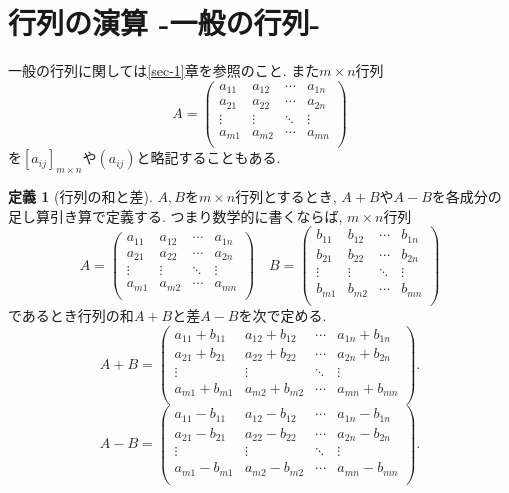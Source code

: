 \documentclass[dvipdfmx,a4paper,11pt]{article}
\theoremstyle{definition}
\newtheorem{dfn}[thm]{定義}
\begin{document}
 
\newpage

\section{行列の演算 -一般の行列-}

一般の行列に関しては\ref{sec-1}章を参照のこと.
また$m \times n$行列
$$
A=\begin{pmatrix}
a_{11}& a_{12} & \cdots &a_{1n} \\
a_{21}& a_{22} & \cdots &a_{2n} \\
\vdots& \vdots	&	\ddots   &	\vdots \\
a_{m1}& a_{m2} & \cdots &a_{mn} \\
\end{pmatrix}
$$
を$[a_{ij}]_{m\times n}$や$(a_{ij})$と略記することもある.


 \begin{tcolorbox}[
    colback = white,
    colframe = green!35!black,
    fonttitle = \bfseries,
    breakable = true]
    \begin{dfn}[行列の和と差]
    \text{}
 $A,B$を$m \times n$行列とするとき, $A+B$や$A-B$を各成分の足し算引き算で定義する. 
 つまり数学的に書くならば, $m \times n$行列
$$
A=\begin{pmatrix}
a_{11}& a_{12} & \cdots &a_{1n} \\
a_{21}& a_{22} & \cdots &a_{2n} \\
\vdots& \vdots	&	\ddots   &	\vdots \\
a_{m1}& a_{m2} & \cdots &a_{mn} \\
\end{pmatrix}
\quad
B=\begin{pmatrix}
b_{11}& b_{12} & \cdots &b_{1n} \\
b_{21}& b_{22} & \cdots &b_{2n} \\
\vdots& \vdots	&	\ddots   &	\vdots \\
b_{m1}& b_{m2} & \cdots &b_{mn} \\
\end{pmatrix}
$$
であるとき行列の和$A+B$と差$A-B$を次で定める.
$$
A+B=
\begin{pmatrix}
a_{11}+b_{11}& a_{12}+b_{12}& \cdots &a_{1n} +b_{1n}\\
a_{21}+b_{21}& a_{22}+b_{22}& \cdots &a_{2n}+b_{2n} \\
\vdots& \vdots	&	\ddots   &	\vdots \\
a_{m1}+b_{m1}& a_{m2} +b_{m2}& \cdots &a_{mn} +b_{mn}\\
\end{pmatrix}.
$$
$$
A-B=
\begin{pmatrix}
a_{11}-b_{11}& a_{12}-b_{12}& \cdots &a_{1n} -b_{1n}\\
a_{21}-b_{21}& a_{22}-b_{22}& \cdots &a_{2n}-b_{2n} \\
\vdots& \vdots	&	\ddots   &	\vdots \\
a_{m1}-b_{m1}& a_{m2}-b_{m2}& \cdots &a_{mn}-b_{mn}\\
\end{pmatrix}.
$$
  \end{dfn}
 \end{tcolorbox}
 
\end{document}
